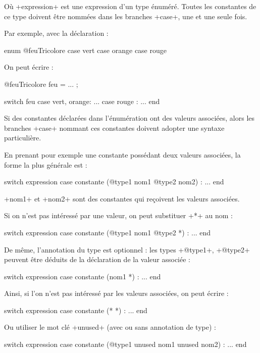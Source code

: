 Où \ggs+expression+ est une expression d'un type énuméré. Toutes les constantes de ce type doivent être nommées dans les branches \ggs+case+, une et une seule fois.

Par exemple, avec la déclaration :

\begin{galgas}
enum @feuTricolore {
  case vert
  case orange
  case rouge
}
\end{galgas}

On peut écrire :

\begin{galgas}
@feuTricolore feu = ... ;

switch feu
case vert, orange:
  ...
case rouge :
  ...
end
\end{galgas}

Si des constantes déclarées dans l'énumération ont des valeurs associées, alors les branches \ggs+case+ nommant ces constantes doivent adopter une syntaxe particulière. 

En prenant pour exemple une constante possédant deux valeurs associées, la forme la plus générale est :

\begin{galgas}
switch expression
case constante (@type1 nom1 @type2 nom2) :
...
end
\end{galgas}

\ggs+nom1+ et \ggs+nom2+ sont des constantes qui reçoivent les valeurs associées.

Si on n'est pas intéressé par une valeur, on peut substituer \ggs+*+ au nom :

\begin{galgas}
switch expression
case constante (@type1 nom1 @type2 *) :
...
end
\end{galgas}

De même, l'annotation du type est optionnel : les types \ggs+@type1+, \ggs+@type2+ peuvent être déduits de la déclaration de la valeur associée :

\begin{galgas}
switch expression
case constante (nom1 *) :
...
end
\end{galgas}

Ainsi, si l'on n'est pas intéressé par les valeurs associées, on peut écrire :
\begin{galgas}
switch expression
case constante (* *) :
...
end
\end{galgas}


Ou utiliser le mot clé \ggs+unused+ (avec ou sans annotation de type) :
\begin{galgas}
switch expression
case constante (@type1 unused nom1 unused nom2) :
...
end
\end{galgas}


